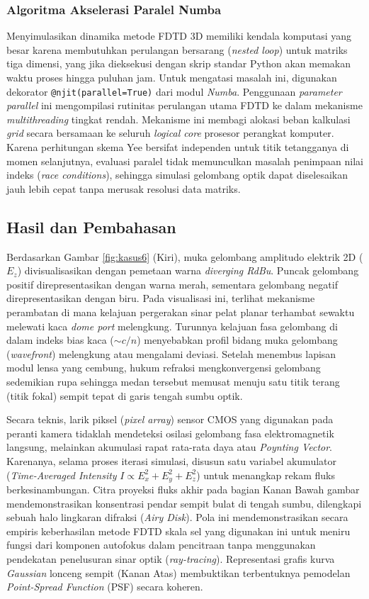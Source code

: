 \documentclass[11pt,a4paper]{article}
\begin{document}
\subsubsection{Algoritma Akselerasi Paralel Numba}
Menyimulasikan dinamika metode FDTD 3D memiliki kendala komputasi yang besar karena membutuhkan perulangan bersarang (\textit{nested loop}) untuk matriks tiga dimensi, yang jika dieksekusi dengan skrip standar Python akan memakan waktu proses hingga puluhan jam. Untuk mengatasi masalah ini, digunakan dekorator \texttt{@njit(parallel=True)} dari modul \textit{Numba}. Penggunaan \textit{parameter} \textit{parallel} ini mengompilasi rutinitas perulangan utama FDTD ke dalam mekanisme \textit{multithreading} tingkat rendah. Mekanisme ini membagi alokasi beban kalkulasi \textit{grid} secara bersamaan ke seluruh \textit{logical core} prosesor perangkat komputer. Karena perhitungan skema Yee bersifat independen untuk titik tetangganya di momen selanjutnya, evaluasi paralel tidak memunculkan masalah penimpaan nilai indeks (\textit{race conditions}), sehingga simulasi gelombang optik dapat diselesaikan jauh lebih cepat tanpa merusak resolusi data matriks.

\subsection{Hasil dan Pembahasan}

Berdasarkan Gambar \ref{fig:kasus6} (Kiri), muka gelombang amplitudo elektrik 2D ($E_z$) divisualisasikan dengan pemetaan warna \textit{diverging RdBu}. Puncak gelombang positif direpresentasikan dengan warna merah, sementara gelombang negatif direpresentasikan dengan biru. Pada visualisasi ini, terlihat mekanisme perambatan di mana kelajuan pergerakan sinar pelat planar terhambat sewaktu melewati kaca \textit{dome port} melengkung. Turunnya kelajuan fasa gelombang di dalam indeks bias kaca ($\sim c/n$) menyebabkan profil bidang muka gelombang (\textit{wavefront}) melengkung atau mengalami deviasi. Setelah menembus lapisan modul lensa yang cembung, hukum refraksi mengkonvergensi gelombang sedemikian rupa sehingga medan tersebut memusat menuju satu titik terang (titik fokal) sempit tepat di garis tengah sumbu optik.

Secara teknis, larik piksel (\textit{pixel array}) sensor CMOS yang digunakan pada peranti kamera tidaklah mendeteksi osilasi gelombang fasa elektromagnetik langsung, melainkan akumulasi rapat rata-rata daya atau \textit{Poynting Vector}. Karenanya, selama proses iterasi simulasi, disusun satu variabel akumulator (\textit{Time-Averaged Intensity} $I \propto E_x^2 + E_y^2 + E_z^2$) untuk menangkap rekam fluks berkesinambungan. Citra proyeksi fluks akhir pada bagian Kanan Bawah gambar mendemonstrasikan konsentrasi pendar sempit bulat di tengah sumbu, dilengkapi sebuah halo lingkaran difraksi (\textit{Airy Disk}). Pola ini mendemonstrasikan secara empiris keberhasilan metode FDTD skala sel yang digunakan ini untuk meniru fungsi dari komponen autofokus dalam pencitraan tanpa menggunakan pendekatan penelusuran sinar optik (\textit{ray-tracing}). Representasi grafis kurva \textit{Gaussian} lonceng sempit (Kanan Atas) membuktikan terbentuknya pemodelan \textit{Point-Spread Function} (PSF) secara koheren.
\end{document}
